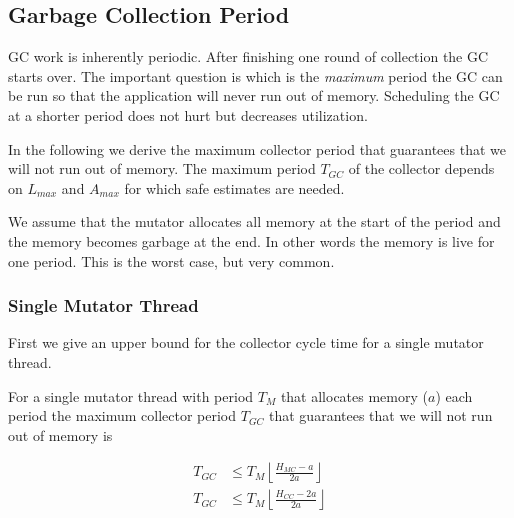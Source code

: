 \subsection{Garbage Collection Period}

GC work is inherently periodic. After finishing one round of
collection the GC starts over. The important question is which is
the \emph{maximum} period the GC can be run so that the application
will never run out of memory. Scheduling the GC at a shorter period
does not hurt but decreases utilization.

In the following we derive the maximum collector period that
guarantees that we will not run out of memory. The maximum period
$T_{GC}$ of the collector depends on $L_{max}$ and $A_{max}$ for
which safe estimates are needed.

We assume that the mutator allocates all memory at the start of the
period and the memory becomes garbage at the end. In other words the
memory is live for one period. This is the worst case, but very
common.

\subsubsection{Single Mutator Thread}

First we give an upper bound for the collector cycle time for a
single mutator thread.

\begin{lemma}

For a single mutator thread with period $T_M$ that allocates memory
($a$) each period the maximum collector period $T_{GC}$ that
guarantees that we will not run out of memory is

\begin{align}\label{sth:mc:lemma}
    T_{GC} & \le T_M\left\lfloor\frac{H_{MC}-a}{2a}\right\rfloor\\
    \label{sth:cc:lemma}
    T_{GC} & \le T_M\left\lfloor\frac{H_{CC}-2a}{2a}\right\rfloor
\end{align}

\end{lemma}

